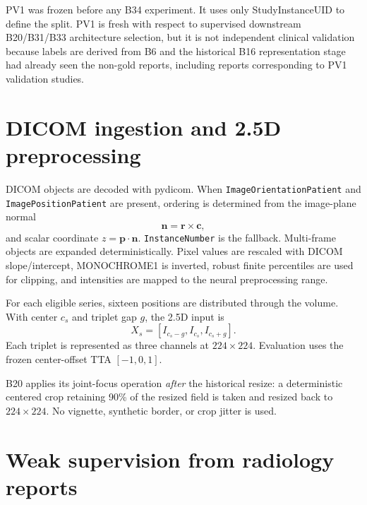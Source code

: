 \documentclass[preprint,12pt]{elsarticle}
\newcommand{\code}[1]{\texttt{#1}}
\begin{document}
PV1 was frozen before any B34 experiment. It uses only StudyInstanceUID to define the split. PV1 is fresh with respect to supervised downstream B20/B31/B33 architecture selection, but it is not independent clinical validation because labels are derived from B6 and the historical B16 representation stage had already seen the non-gold reports, including reports corresponding to PV1 validation studies.

\section{DICOM ingestion and 2.5D preprocessing}
\label{sec:dicom}

DICOM objects are decoded with pydicom. When \code{ImageOrientationPatient} and \code{ImagePositionPatient} are present, ordering is determined from the image-plane normal
\begin{equation}
\mathbf n=\mathbf r\times\mathbf c,
\end{equation}
and scalar coordinate $z=\mathbf p\cdot\mathbf n$. \code{InstanceNumber} is the fallback. Multi-frame objects are expanded deterministically. Pixel values are rescaled with DICOM slope/intercept, MONOCHROME1 is inverted, robust finite percentiles are used for clipping, and intensities are mapped to the neural preprocessing range.

For each eligible series, sixteen positions are distributed through the volume. With center $c_s$ and triplet gap $g$, the 2.5D input is
\begin{equation}
X_s=[I_{c_s-g},I_{c_s},I_{c_s+g}].
\end{equation}
Each triplet is represented as three channels at $224\times224$. Evaluation uses the frozen center-offset TTA $[-1,0,1]$.

B20 applies its joint-focus operation \emph{after} the historical resize: a deterministic centered crop retaining 90\% of the resized field is taken and resized back to $224\times224$. No vignette, synthetic border, or crop jitter is used.

\section{Weak supervision from radiology reports}
\label{sec:reports}
\end{document}
